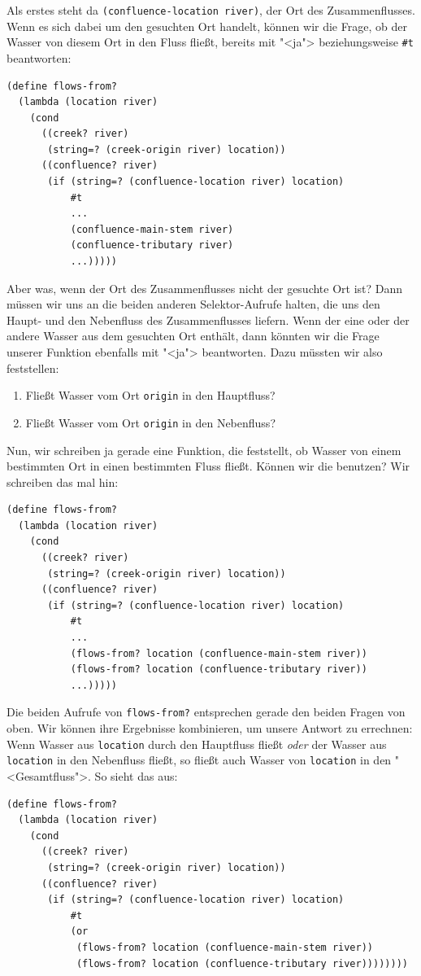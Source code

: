 Als erstes steht da \lstinline{(confluence-location river)}, der Ort
des Zusammenflusses.  Wenn es sich dabei um den gesuchten Ort handelt,
können wir die Frage, ob der Wasser von diesem Ort in den Fluss fließt, bereits
mit "<ja"> beziehungsweise \lstinline{#t} beantworten:
%
\begin{lstlisting}
(define flows-from?
  (lambda (location river)
    (cond
      ((creek? river)
       (string=? (creek-origin river) location))
      ((confluence? river)
       (if (string=? (confluence-location river) location)
           #t
           ...
           (confluence-main-stem river)
           (confluence-tributary river)
           ...)))))
\end{lstlisting}
%
Aber was, wenn der Ort des Zusammenflusses nicht der gesuchte Ort ist?
Dann müssen wir uns an die beiden anderen
Selektor-Aufrufe halten, die uns den Haupt- und den Nebenfluss des
Zusammenflusses liefern.  Wenn der eine oder der andere Wasser aus dem
gesuchten Ort enthält, dann könnten wir die Frage unserer Funktion
ebenfalls mit "<ja"> beantworten.  Dazu müssten wir also feststellen:
%
\begin{enumerate}
\item Fließt Wasser vom Ort \lstinline{origin} in den Hauptfluss?
\item Fließt Wasser vom Ort \lstinline{origin} in den Nebenfluss?
\end{enumerate}
%
Nun, wir schreiben ja gerade eine Funktion, die feststellt, ob Wasser
von einem bestimmten Ort in einen bestimmten Fluss fließt.  Können wir
die benutzen?  Wir schreiben das mal hin:
%
\begin{lstlisting}
(define flows-from?
  (lambda (location river)
    (cond
      ((creek? river)
       (string=? (creek-origin river) location))
      ((confluence? river)
       (if (string=? (confluence-location river) location)
           #t
           ...
           (flows-from? location (confluence-main-stem river))
           (flows-from? location (confluence-tributary river))
           ...)))))
\end{lstlisting}
%
Die beiden Aufrufe von \lstinline{flows-from?} entsprechen gerade
den beiden Fragen von oben.  Wir können ihre Ergebnisse kombinieren,
um unsere Antwort zu errechnen: Wenn Wasser aus \lstinline{location}
durch den Hauptfluss fließt \emph{oder} der Wasser aus
\lstinline{location} in den Nebenfluss fließt, so fließt auch Wasser
von \lstinline{location} in den "<Gesamtfluss">.  So sieht das aus:
%
\begin{lstlisting}
(define flows-from?
  (lambda (location river)
    (cond
      ((creek? river)
       (string=? (creek-origin river) location))
      ((confluence? river)
       (if (string=? (confluence-location river) location)
           #t
           (or
            (flows-from? location (confluence-main-stem river))
            (flows-from? location (confluence-tributary river))))))))
\end{lstlisting}
